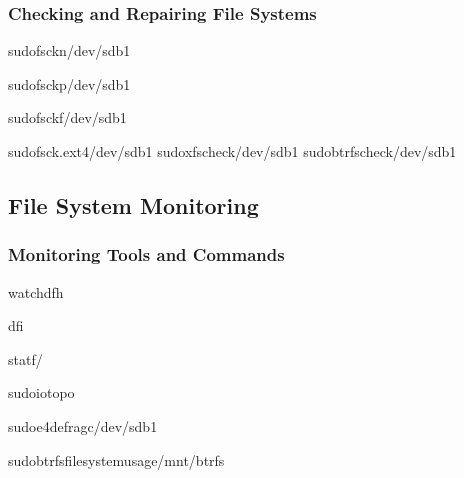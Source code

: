 \documentclass[letterpaper,10pt,english]{sphinxmanual}
\begin{document}
\subsubsection{Checking and Repairing File Systems}
\label{\detokenize{file-systems:checking-and-repairing-file-systems}}
\begin{sphinxVerbatim}[commandchars=\\\{\}]
sudofsck\PYGZhy{}n/dev/sdb1

sudofsck\PYGZhy{}p/dev/sdb1

sudofsck\PYGZhy{}f/dev/sdb1

sudofsck.ext4/dev/sdb1
sudoxfs\PYGZus{}check/dev/sdb1
sudobtrfscheck/dev/sdb1
\end{sphinxVerbatim}


\subsection{File System Monitoring}
\label{\detokenize{file-systems:file-system-monitoring}}

\subsubsection{Monitoring Tools and Commands}
\label{\detokenize{file-systems:monitoring-tools-and-commands}}
\begin{sphinxVerbatim}[commandchars=\\\{\}]
watchdf\PYGZhy{}h

df\PYGZhy{}i

stat\PYGZhy{}f/

sudoiotop\PYGZhy{}o

sudoe4defrag\PYGZhy{}c/dev/sdb1

sudobtrfsfilesystemusage/mnt/btrfs
\end{sphinxVerbatim}
\end{document}
